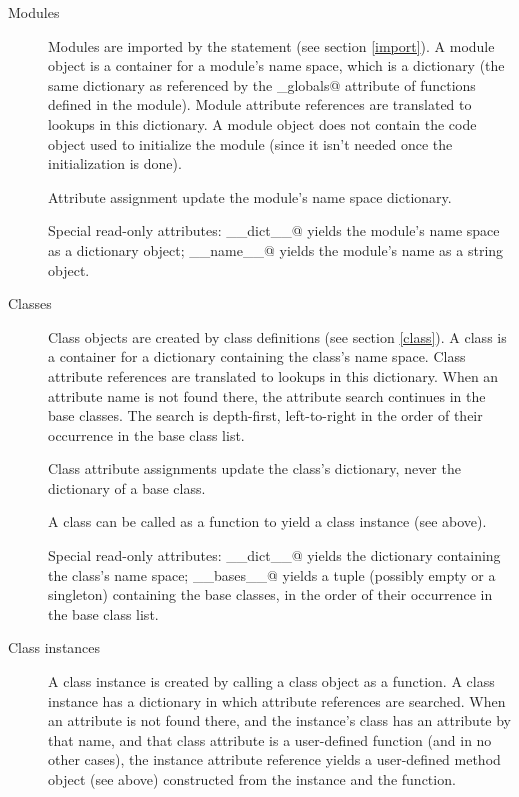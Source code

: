 \begin{description}
\item[Modules]
Modules are imported by the \verb@import@ statement (see section
\ref{import}).  A module object is a container for a module's name
space, which is a dictionary (the same dictionary as referenced by the
\verb@func_globals@ attribute of functions defined in the module).
Module attribute references are translated to lookups in this
dictionary.  A module object does not contain the code object used to
initialize the module (since it isn't needed once the initialization
is done).

Attribute assignment update the module's name space dictionary.

Special read-only attributes: \verb@__dict__@ yields the module's name
space as a dictionary object; \verb@__name__@ yields the module's name
as a string object.

\item[Classes]
Class objects are created by class definitions (see section
\ref{class}).  A class is a container for a dictionary containing the
class's name space.  Class attribute references are translated to
lookups in this dictionary.  When an attribute name is not found
there, the attribute search continues in the base classes.  The search
is depth-first, left-to-right in the order of their occurrence in the
base class list.

Class attribute assignments update the class's dictionary, never the
dictionary of a base class.

A class can be called as a function to yield a class instance (see
above).

Special read-only attributes: \verb@__dict__@ yields the dictionary
containing the class's name space; \verb@__bases__@ yields a tuple
(possibly empty or a singleton) containing the base classes, in the
order of their occurrence in the base class list.

\item[Class instances]
A class instance is created by calling a class object as a
function.  A class instance has a dictionary in which
attribute references are searched.  When an attribute is not found
there, and the instance's class has an attribute by that name, and
that class attribute is a user-defined function (and in no other
cases), the instance attribute reference yields a user-defined method
object (see above) constructed from the instance and the function.


\end{description}
